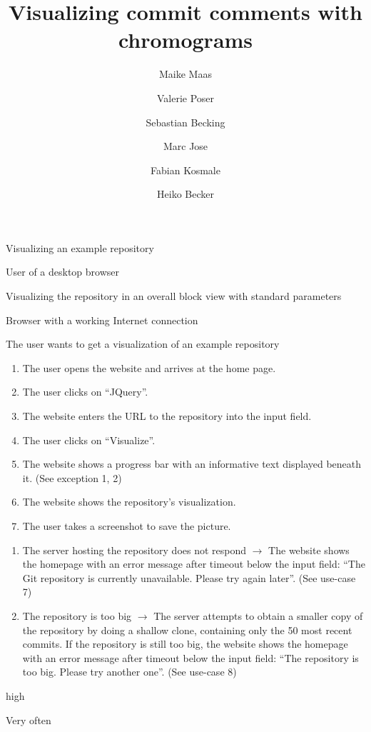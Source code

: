 \documentclass[11pt]{scrartcl}
\author{Maike Maas \and Valerie Poser \and Sebastian Becking \and
        Marc Jose \and Fabian Kosmale \and Heiko Becker}
\title{Visualizing commit comments with chromograms}
\begin{document}
\maketitle

\begin{description}[leftmargin=!,labelwidth=\widthof{\bfseries Frequency of use:}]
	\item[Use-case:] Visualizing an example repository 
	\item[Primary actor:] User of a desktop browser 
	\item[Goal in context:] Visualizing the repository in an overall block view with standard parameters 
	\item[Preconditions:] Browser with a working Internet connection
	\item[Trigger:] The user wants to get a visualization of an example repository

	\item[Scenario:]
		\begin{enumerate}[leftmargin=1.5em]
			\item The user opens the website and arrives at the home page.
			\item The user clicks on \enquote{JQuery}.
			\item The website enters the URL to the repository into the input field.
			\item The user clicks on \enquote{Visualize}.
			\item The website shows a progress bar with an informative text displayed beneath
				it. (See exception 1, 2)
			\item The website shows the repository's visualization.
			\item The user takes a screenshot to save the picture. 
		\end{enumerate}

	\item[Exceptions:]
		\begin{enumerate}[leftmargin=1.5em]
			\item The server hosting the repository does not respond $\rightarrow$ The
				website shows the homepage with an error message after timeout below the input 	
				field: 	\enquote{The Git repository is currently unavailable. Please try again later}.  
				(See use-case 7)
			\item The repository is too big $\rightarrow$  The server attempts to obtain a
				smaller copy of the repository by doing a shallow clone, containing only
				the 50 most recent commits. If the repository is still too big, the
				website shows the homepage with an error message after timeout below the input 	
				field: \enquote{The repository is too big. Please try another one}. (See use-case 8)
		\end{enumerate}

	\item[Priority:] high
	\item[Frequency of use:] Very often

\end{description}
\end{document}
